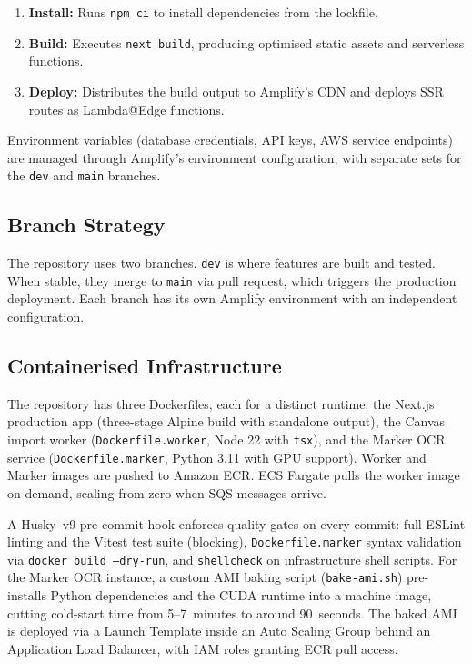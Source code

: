 \documentclass[12pt,a4paper]{article}
\newcommand{\tech}[1]{\texttt{#1}}
\begin{document}
\begin{enumerate}[leftmargin=1.5em]
    \item \textbf{Install:} Runs \tech{npm ci} to install dependencies from the lockfile.
    \item \textbf{Build:} Executes \tech{next build}, producing optimised static assets and serverless functions.
    \item \textbf{Deploy:} Distributes the build output to Amplify's CDN and deploys SSR routes as Lambda@Edge functions.
\end{enumerate}

Environment variables (database credentials, API keys, AWS service endpoints) are managed through Amplify's environment configuration, with separate sets for the \tech{dev} and \tech{main} branches.

\subsection{Branch Strategy}

The repository uses two branches. \tech{dev} is where features are built and tested. When stable, they merge to \tech{main} via pull request, which triggers the production deployment. Each branch has its own Amplify environment with an independent configuration.

\subsection{Containerised Infrastructure}

\begin{sloppypar}
The repository has three Dockerfiles, each for a distinct runtime: the Next.js production app (three-stage Alpine build with standalone output), the Canvas import worker (\tech{Dockerfile.worker}, Node 22 with \tech{tsx}), and the Marker OCR service (\tech{Dockerfile.marker}, Python 3.11 with GPU support). Worker and Marker images are pushed to Amazon ECR. ECS Fargate pulls the worker image on demand, scaling from zero when SQS messages arrive.

A Husky~v9 pre-commit hook enforces quality gates on every commit: full ESLint linting and the Vitest test suite (blocking), \tech{Dockerfile.marker} syntax validation via \tech{docker build --dry-run}, and \tech{shellcheck} on infrastructure shell scripts. For the Marker OCR instance, a custom AMI baking script (\tech{bake-ami.sh}) pre-installs Python dependencies and the CUDA runtime into a machine image, cutting cold-start time from 5--7~minutes to around 90~seconds. The baked AMI is deployed via a Launch Template inside an Auto Scaling Group behind an Application Load Balancer, with IAM roles granting ECR pull access.
\end{sloppypar}
\end{document}
